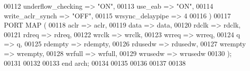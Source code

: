 \begin{DoxyCode}
00112         underflow\_checking      => \textcolor{keyword}{"ON"},
00113         use\_eab                 => \textcolor{keyword}{"ON"},
00114         write\_aclr\_synch        => \textcolor{keyword}{"OFF"},
00115         wrsync\_delaypipe        => \textcolor{vhdllogic}{4}
00116     \textcolor{vhdlchar}{)}
00117     \textcolor{keywordflow}{PORT} \textcolor{keywordflow}{MAP} (
00118         aclr        => aclr,
00119         data        => data,
00120         rdclk       => rdclk,
00121         rdreq       => rdreq,
00122         wrclk       => wrclk,
00123         wrreq       => wrreq,
00124         q           => q,
00125         rdempty     => rdempty,
00126         rdusedw     => rdusedw,
00127         wrempty => wrempty,
00128         wrfull      => wrfull,
00129         wrusedw => wrusedw
00130     \textcolor{vhdlchar}{)};
00131 
00132   
00133 \textcolor{keywordflow}{end} \textcolor{vhdlchar}{arch};   
00134 
00135 
00136 
00137 
00138 
\end{DoxyCode}

